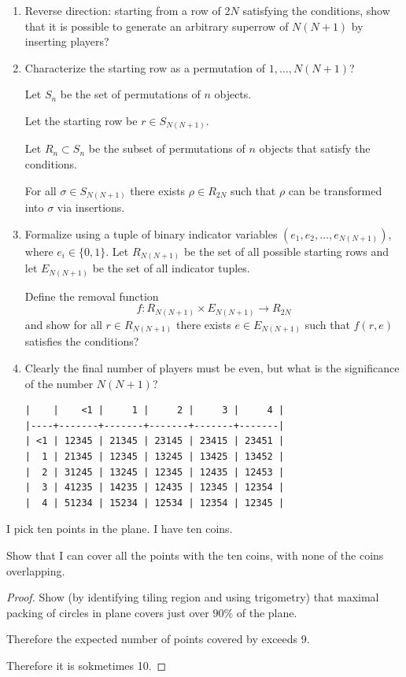 \documentclass[12pt]{article}
\begin{document}
\begin{enumerate}
\item Reverse direction: starting from a row of $2N$ satisfying the conditions, show that it is
  possible to generate an arbitrary superrow of $N(N+1)$ by inserting players?
\item Characterize the starting row as a permutation of $1, \ldots, N(N+1)$?

  Let $S_n$ be the set of permutations of $n$ objects.

  Let the starting row be $r \in S_{N(N+1)}$.

  Let $R_n \subset S_n$ be the subset of permutations of $n$ objects that satisfy the conditions.

  \begin{claim*}
    For all $\sigma \in S_{N(N+1)}$ there exists $\rho \in R_{2N}$ such that $\rho$ can be
    transformed into $\sigma$ via insertions.
  \end{claim*}

\item Formalize using a tuple of binary indicator variables $(e_1, e_2, \ldots, e_{N(N+1)})$, where
  $e_i \in \{0, 1\}$. Let $R_{N(N+1)}$ be the set of all possible starting rows and let $E_{N(N+1)}$
    be the set of all indicator tuples.

  Define the removal function
  $$f:R_{N(N+1)} \times E_{N(N+1)} \to R_{2N}$$
  and show for all $r \in R_{N(N+1)}$ there exists $e \in E_{N(N+1)}$ such that $f(r, e)$ satisfies
  the conditions?
\item Clearly the final number of players must be even, but what is the significance of the number
  $N(N+1)$?

\begin{verbatim}
|    |    <1 |     1 |     2 |     3 |     4 |
|----+-------+-------+-------+-------+-------|
| <1 | 12345 | 21345 | 23145 | 23415 | 23451 |
|  1 | 21345 | 12345 | 13245 | 13425 | 13452 |
|  2 | 31245 | 13245 | 12345 | 12435 | 12453 |
|  3 | 41235 | 14235 | 12435 | 12345 | 12354 |
|  4 | 51234 | 15234 | 12534 | 12354 | 12345 |
\end{verbatim}
\end{enumerate}

\newpage
\begin{mdframed}
   I pick ten points in the plane. I have ten coins.

   Show that I can cover all the points with the ten coins, with none of the coins overlapping.
\end{mdframed}

\begin{proof}
  Show (by identifying tiling region and using trigometry) that maximal packing of circles in plane
  covers just over $90\%$ of the plane.

  Therefore the expected number of points covered by exceeds 9.

  Therefore it is sokmetimes 10.
\end{proof}
\end{document}
